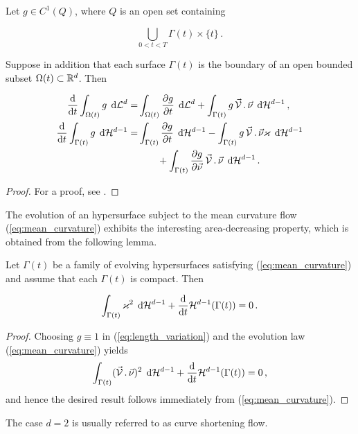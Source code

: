 \begin{lemma}
Let $g \in C^1(Q)$, where $Q$ is an open set containing

\begin{equation}
\bigcup_{0 < t < T} \Gamma(t) \times \{ t \} \, .
\end{equation}

Suppose in addition that each surface $\Gamma(t)$ is the boundary of an open
bounded subset $\Omega(t) \subset \mathbb R^d$. Then

\begin{align}
\frac{\rm d}{{\rm d}t} \int_{\Omega(t)} g \, \;{\rm d}{\cal L}^{d}  = &
\int_{\Omega(t)} \frac{\partial g}{\partial t} \, \;{\rm d}{\cal L}^{d}
+ \int_{\Gamma(t)} g \,\vec{\mathcal{V}}\,.\,\vec\nu \, \;{\rm d}{\cal H}^{d-1} \, ,
\label{eq:volume_variation} \\
\frac{\rm d}{{\rm d}t} \int_{\Gamma(t)} g \, \;{\rm d}{\cal H}^{d-1}  = &
\int_{\Gamma(t)} \frac{\partial g}{\partial t} \, \;{\rm d}{\cal H}^{d-1} -
\int_{\Gamma(t)} g \, \vec{\mathcal{V}}\,.\,\vec\nu \varkappa \, \;{\rm d}{\cal H}^{d-1}
\nonumber \\
& \qquad + \int_{\Gamma(t)} \frac{\partial g}{\partial \vec \nu}\,
\vec{\mathcal{V}}\,.\,\vec\nu \, \;{\rm d}{\cal H}^{d-1} \, .\label{eq:length_variation}
\end{align}
\end{lemma}

\begin{proof}
For a proof, see \cite[\S2.6, Lemma 2.1]{DeckelnickDE05}.
\end{proof}

The evolution of an hypersurface subject to the mean curvature flow
(\ref{eq:mean_curvature}) exhibits the interesting area-decreasing property,
which is obtained from the following lemma.

\begin{lemma}
Let $\Gamma(t)$ be a family of evolving hypersurfaces satisfying
(\ref{eq:mean_curvature}) and assume that each $\Gamma(t)$ is
compact. Then

\begin{equation}
\int_{\Gamma(t)} \varkappa^2 \, \;{\rm d}{\cal H}^{d-1} +
\frac{\rm d}{{\rm d}t} \mathcal{H}^{d-1}(\Gamma(t)) = 0 \, . \label{eq:length_decrease}
\end{equation}

\end{lemma}

\begin{proof}
Choosing $g \equiv 1$ in (\ref{eq:length_variation}) and the evolution law
(\ref{eq:mean_curvature}) yields
\begin{equation*}
\int_{\Gamma(t)} (\vec{\mathcal{V}}\,.\,\vec\nu)^2 \,\;{\rm d}{\cal H}^{d-1} +\frac{\rm d}{{\rm d}t} \mathcal{H}^{d-1}(\Gamma(t)) = 0\,,
\end{equation*}
and hence the desired result follows immediately from (\ref{eq:mean_curvature}).
\end{proof}
The case $d = 2$ is usually referred to as curve shortening flow.

